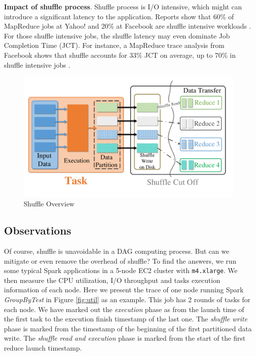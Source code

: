 
\textbf{Impact of shuffle process}. Shuffle process is I/O intensive, which might can introduce a significant latency to the application. Reports show that 60\% of MapReduce jobs at Yahoo!
and 20\% at Facebook are shuffle intensive workloads \cite{shufflewatcher}. For those shuffle intensive jobs, the shuffle latency may even dominate Job Completion Time (JCT). 
For instance, a MapReduce trace analysis from Facebook shows that shuffle accounts for 33\% JCT on average, up to 70\% in shuffle intensive jobs \cite{managing}.
\begin{figure}
	\centering
	\includegraphics[width=\linewidth]{fig/shuffle_process}
	\caption{Shuffle Overview}
	\label{fig:shuffle_process}
\end{figure}

\subsection{Observations} \label{observation}
Of course, shuffle is unavoidable in a DAG computing process. But can we mitigate or even remove the overhead of shuffle? To find the answers, we run some typical Spark applications in a 5-node EC2 cluster with \texttt{m4.xlarge}. We then measure the CPU utilization, I/O throughput and tasks execution information of each node. Here we present the trace of one node running Spark \textit{GroupByTest} in Figure \ref{fig:util} as an example. This job has 2 rounds of tasks for each node. 
We have marked out the \textit{execution} phase as from the launch time of the first task to the execution finish timestamp of the last one. The \textit{shuffle write} phase is marked from the timestamp of the beginning of the first partitioned data write. The \textit{shuffle read and execution} phase is marked from the start of the first reduce launch timestamp.

